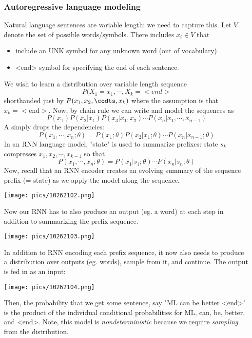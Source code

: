 \documentclass[11pt]{scrartcl}
\begin{document}
\subsubsection{Autoregressive language modeling}
Natural language sentences are variable length: we need to capture this. Let $V$ denote the set of possible words/symbols. There includes $x_i \in V$ that 
\begin{itemize}
    \item include an UNK symbol for any unknown word (out of vocabulary)
    \item <end> symbol for specifying the end of each sentence.
\end{itemize}
We wish to learn a distribution over variable length sequence 
$$P(X_1=x_1, \cdots, X_k = <end>$$
shorthanded just by $P(x_1,x_2,\codts,x_k)$ where the assumption is that $x_k = <\text{end}>$. Now, by chain rule we can write and model the sequences as 
$$P(x_1)P(x_2|x_1)P(x_3|x_1,x_2) \cdots P(x_n|x_1,\cdots,x_{n-1})$$
A  simply drops the dependencies:
$$P(x_1,\cdots,x_n;\theta)=P(x_1;\theta)P(x_2|x_1;\theta)\cdots P(x_n|x_{n-1};\theta)$$
In an RNN language model, "state" is used to summarize prefixes: state $s_k$ compresses $x_1,x_2,\cdots,x_{k-1}$ so that $$P(x_1,\cdots,x_n;\theta)=P(x_1|s_1;\theta)\cdots{P(x_n|s_n;\theta)}$$
Now, recall that an RNN encoder creates an evolving summary of the sequence prefix (= state) as we apply the model along the sequence. 
\begin{center}
    \texttt{[image: pics/10262102.png]}
\end{center}
Now our RNN has to also produce an output (eg. a word) at each step in addition to summarizing the prefix sequence. 
\begin{center}
    \texttt{[image: pics/10262103.png]}
\end{center}
In addition to RNN encoding each prefix sequence, it now also needs to produce a distribution over outputs (eg. words), sample from it, and continue. The output is fed in as an input:
\begin{center}
    \texttt{[image: pics/10262104.png]}
\end{center}
Then, the probability that we get some sentence, say "ML can be better <end>" is the product of the individual conditional probabilities for ML, can, be, better, and <end>. Note, this model is \textit{nondeterministic} because we require \textit{sampling} from the distribution. 
\end{document}

